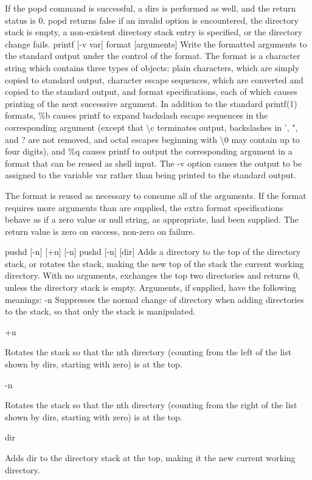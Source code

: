 If the popd command is successful, a dirs is performed as well, and the return status is 0. popd returns false if an invalid option is encountered, the directory stack is empty, a non-existent directory stack entry is specified, or the directory change fails.
printf [-v var] format [arguments]
Write the formatted arguments to the standard output under the control of the format. The format is a character string which contains three types of objects: plain characters, which are simply copied to standard output, character escape sequences, which are converted and copied to the standard output, and format specifications, each of which causes printing of the next successive argument. In addition to the standard printf(1) formats, \%b causes printf to expand backslash escape sequences in the corresponding argument (except that \textbackslash c terminates output, backslashes in ', ", and ? are not removed, and octal escapes beginning with \textbackslash 0 may contain up to four digits), and \%q causes printf to output the corresponding argument in a format that can be reused as shell input.
The -v option causes the output to be assigned to the variable var rather than being printed to the standard output.

The format is reused as necessary to consume all of the arguments. If the format requires more arguments than are supplied, the extra format specifications behave as if a zero value or null string, as appropriate, had been supplied. The return value is zero on success, non-zero on failure.

pushd [-n] [+n] [-n]
pushd [-n] [dir]
Adds a directory to the top of the directory stack, or rotates the stack, making the new top of the stack the current working directory. With no arguments, exchanges the top two directories and returns 0, unless the directory stack is empty. Arguments, if supplied, have the following meanings:
-n
Suppresses the normal change of directory when adding directories to the stack, so that only the stack is manipulated.

+n

Rotates the stack so that the nth directory (counting from the left of the list shown by dirs, starting with zero) is at the top.

-n

Rotates the stack so that the nth directory (counting from the right of the list shown by dirs, starting with zero) is at the top.

dir

Adds dir to the directory stack at the top, making it the new current working directory.

